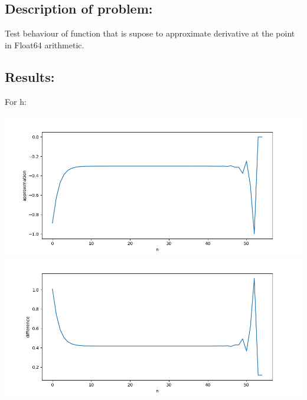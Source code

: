 \documentclass{article}
\begin{document}
\subsection*{Description of problem:}
Test behaviour of function that is supose to approximate derivative at the point in Float64 arithmetic.

\subsection*{Results:}
For h:
\begin{center}
    \includegraphics[scale=0.5]{h_approximation} 
    \includegraphics[scale=0.5]{h_difference} 
\end{center}
\end{document}
